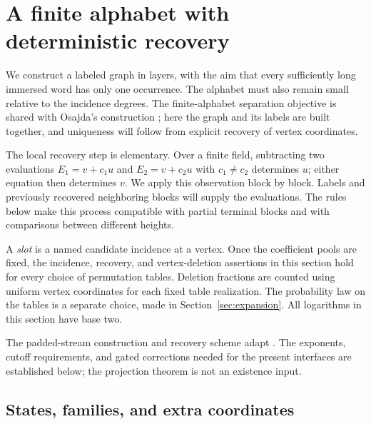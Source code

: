 \section{A finite alphabet with deterministic recovery}
\label{sec:labeling}

We construct a labeled graph in layers, with the aim that every sufficiently
long immersed word has only one occurrence.  The alphabet must also remain
small relative to the incidence degrees.  The finite-alphabet separation
objective is shared with Osajda's construction
\cite[\S\S2.1--2.3, Theorem~2.7]{Osa20}; here the graph and its labels are
built together, and uniqueness will follow from explicit recovery of vertex
coordinates.

The local recovery step is elementary.  Over a finite field, subtracting
two evaluations $E_1=v+c_1u$ and $E_2=v+c_2u$ with $c_1\ne c_2$
determines $u$; either equation then determines $v$.  We apply this
observation block by block.  Labels and previously recovered neighboring
blocks will supply the evaluations.  The rules below make this process
compatible with partial terminal blocks and with comparisons between
different heights.

A \emph{slot} is a named candidate incidence at a vertex.  Once the
coefficient pools are fixed, the incidence, recovery, and vertex-deletion
assertions in this section hold for every choice of permutation tables.
Deletion fractions are counted using uniform vertex coordinates for each
fixed table realization.  The probability law on the tables is a separate
choice, made in Section~\ref{sec:expansion}.  All logarithms in this section
have base two.

The padded-stream construction and recovery scheme adapt
\cite[Sections~4 and~6]{OpenAIProjection}.  The exponents, cutoff requirements,
and gated corrections needed for the present interfaces are established
below; the projection theorem is not an existence input.

\subsection{States, families, and extra coordinates}

